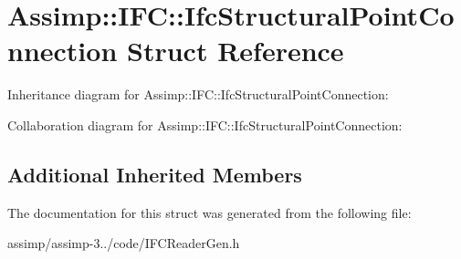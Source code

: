 \hypertarget{struct_assimp_1_1_i_f_c_1_1_ifc_structural_point_connection}{\section{Assimp\+:\+:I\+F\+C\+:\+:Ifc\+Structural\+Point\+Connection Struct Reference}
\label{struct_assimp_1_1_i_f_c_1_1_ifc_structural_point_connection}
}


Inheritance diagram for Assimp\+:\+:I\+F\+C\+:\+:Ifc\+Structural\+Point\+Connection\+:


Collaboration diagram for Assimp\+:\+:I\+F\+C\+:\+:Ifc\+Structural\+Point\+Connection\+:
\subsection*{Additional Inherited Members}


The documentation for this struct was generated from the following file\+:\begin{DoxyCompactItemize}
\item 
assimp/assimp-\/3../code/I\+F\+C\+Reader\+Gen.\+h\end{DoxyCompactItemize}
